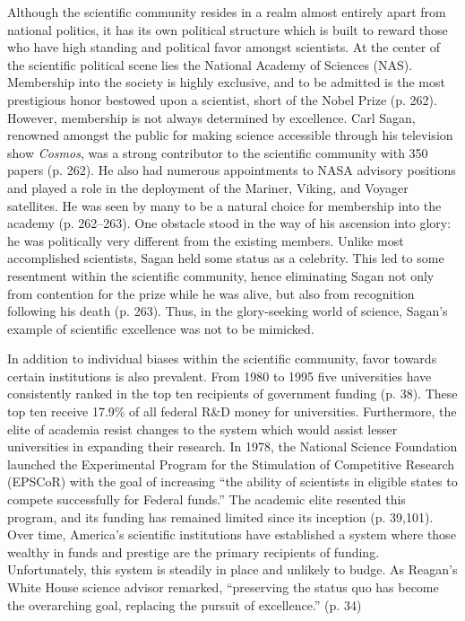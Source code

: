\documentclass{article}[12pt]
\begin{document}
Although the scientific community resides in a realm almost entirely apart from
national politics, it has its own political structure which is built to reward
those who have high standing and political favor amongst scientists. At the
center of the scientific political scene lies the National Academy of Sciences
(NAS).  Membership into the society is highly exclusive, and to be admitted is
the most prestigious honor bestowed upon a scientist, short of the Nobel Prize
(p. 262). However, membership is not always determined by excellence. Carl
Sagan, renowned amongst the public for making science accessible through his
television show \emph{Cosmos}, was a strong contributor to the scientific
community with 350 papers (p. 262).  He also had numerous appointments to NASA
advisory positions and played a role in the deployment of the Mariner, Viking,
and Voyager satellites. He was seen by many to be a natural choice for
membership into the academy (p. 262--263). One obstacle stood in the way of his
ascension into glory: he was politically very different from the existing
members. Unlike most accomplished scientists, Sagan held some status as a
celebrity. This led to some resentment within the scientific community, hence
eliminating Sagan not only from contention for the prize while he was alive,
but also from recognition following his death (p. 263). Thus, in the
glory-seeking world of science, Sagan's example of scientific excellence was
not to be mimicked.

In addition to individual biases within the scientific community, favor
towards certain institutions is also prevalent.  From 1980 to 1995 five
universities have consistently ranked in the top ten recipients of government
funding (p. 38).  These top ten receive 17.9\% of all federal R\&D money
for universities. Furthermore, the elite of academia resist changes to the
system which would assist lesser universities in expanding their research. In
1978, the National Science Foundation launched the Experimental Program for the
Stimulation of Competitive Research (EPSCoR) with the goal of increasing ``the
ability of scientists in eligible states to compete successfully for Federal
funds.'' The academic elite resented this program, and its funding has remained
limited since its inception (p. 39,101).  Over time, America's scientific
institutions have established a system where those wealthy in funds and
prestige are the primary recipients of funding.  Unfortunately, this system is
steadily in place and unlikely to budge. As Reagan's White House science
advisor remarked, ``preserving the status quo has become the overarching goal,
replacing the pursuit of excellence.'' (p. 34)
\end{document}
